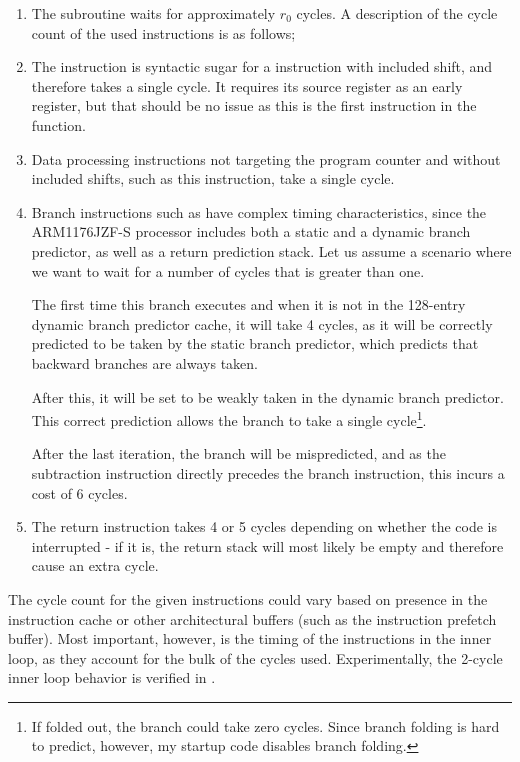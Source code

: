 \begin{enumerate}
    \item The  subroutine waits for approximately $r_0$ cycles. A description of the cycle count of the used instructions is as follows;
    \item The  instruction is syntactic sugar for a  instruction with included shift, and therefore takes a single cycle\cite[p. 16-7]{arm:arm1176}. It requires its source register as an early register, but that should be no issue as this is the first instruction in the function.
    \setcounter{enumi}{3}
    \item Data processing instructions not targeting the program counter and without included shifts, such as this  instruction, take a single cycle\cite[p. 16-7]{arm:arm1176}.
    \item Branch instructions such as  have complex timing characteristics, since the ARM1176JZF-S processor includes both a static and a dynamic branch predictor, as well as a return prediction stack\cite[p. 16-2]{arm:arm1176}. Let us assume a scenario where we want to wait for a number of cycles that is greater than one.

    The first time this branch executes and when it is not in the 128-entry dynamic branch predictor cache, it will take 4 cycles, as it will be correctly predicted to be taken by the static branch predictor, which predicts that backward branches are always taken\cite[p. 5-5]{arm:arm1176}.

    After this, it will be set to be weakly taken in the dynamic branch predictor. This correct prediction allows the branch to take a single cycle\footnote{If folded out, the branch could take zero cycles. Since branch folding is hard to predict, however, my startup code disables branch folding.}\cite{arm:arm1176}.

    After the last iteration, the branch will be mispredicted, and as the subtraction instruction directly precedes the branch instruction, this incurs a cost of 6 cycles.
    \item The return instruction takes 4 or 5 cycles depending on whether the code is interrupted - if it is, the return stack will most likely be empty and therefore cause an extra cycle.
\end{enumerate}

The cycle count for the given instructions could vary based on presence in the instruction cache or other architectural buffers (such as the instruction prefetch buffer). Most important, however, is the timing of the instructions in the inner loop, as they account for the bulk of the cycles used. Experimentally, the 2-cycle inner loop behavior is verified in .

